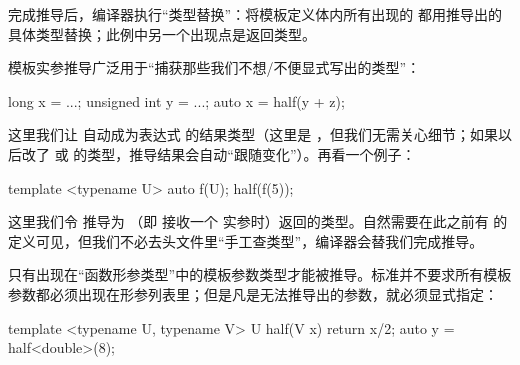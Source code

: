 完成推导后，编译器执行“类型替换”：将模板定义体内所有出现的  都用推导出的具体类型替换；此例中另一个出现点是返回类型。

模板实参推导广泛用于“捕获那些我们不想/不便显式写出的类型”：

\begin{code}
long x = ...;
unsigned int y = ...;
auto x = half(y + z);
\end{code}

这里我们让  自动成为表达式  的结果类型（这里是 ，但我们无需关心细节；如果以后改了  或  的类型，推导结果会自动“跟随变化”）。再看一个例子：

\begin{code}
template <typename U> auto f(U);
half(f(5));
\end{code}

这里我们令  推导为 （即  接收一个  实参时）返回的类型。自然需要在此之前有  的定义可见，但我们不必去头文件里“手工查类型”，编译器会替我们完成推导。

只有出现在“函数形参类型”中的模板参数类型才能被推导。标准并不要求所有模板参数都必须出现在形参列表里；但是凡是无法推导出的参数，就必须显式指定：

\begin{code}
template <typename U, typename V> U half(V x) {
  return x/2;
}
auto y = half<double>(8);
\end{code}

